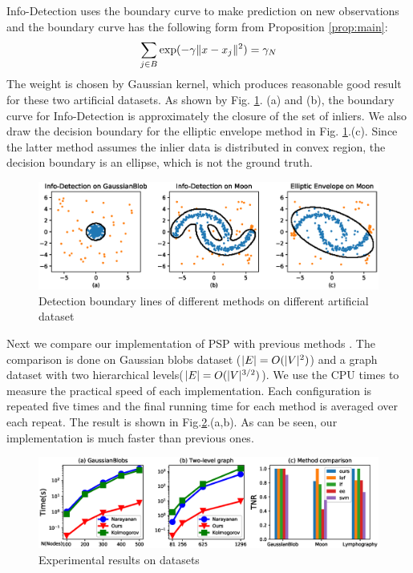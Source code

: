 \documentclass[runningheads]{llncs}
\begin{document}
Info-Detection uses the boundary curve to make prediction on new observations and the boundary curve has the following form from Proposition \ref{prop:main}:
\begin{equation}
\sum_{j \in B} \exp(-\gamma \lVert x - x_j\rVert^2)= \gamma_N
\end{equation}
The weight is chosen by Gaussian kernel, which produces reasonable good result for these two artificial datasets. As shown by Fig. \ref{fig:boundary}. (a) and (b), the boundary curve for Info-Detection is approximately the closure of the set of inliers. We also draw the decision boundary for the elliptic envelope method in Fig. \ref{fig:boundary}.(c). Since the latter method assumes the inlier data is distributed in convex region, the decision boundary is an ellipse, which is not the ground truth.
\begin{figure}[!ht]
	\centering
	\includegraphics[width=\textwidth]{pic/outlier_boundary_illustration.eps}
	\caption{Detection boundary lines of different methods on different artificial dataset}	\label{fig:boundary}
\end{figure}

Next we compare our implementation of PSP with previous methods \cite{RN3,RN4}. The comparison is done on Gaussian blobs dataset ($\lvert E\rvert=O(\lvert V\rvert^2)$) and a graph dataset with two hierarchical levels($\lvert E\rvert=O(\lvert V\rvert^{3/2})$). We use the CPU times to measure the practical speed of each implementation. Each configuration is repeated five times and the final running time for each method is averaged over each repeat.  The result is shown in Fig.\ref{fig:er}.(a,b). As can be seen, our implementation is much faster than previous ones.

\begin{figure}[!ht]
\centering
\includegraphics[width=\textwidth]{pic/experimental_results_triple.eps}
\caption{Experimental results on datasets}\label{fig:er}
\end{figure}
\end{document}
